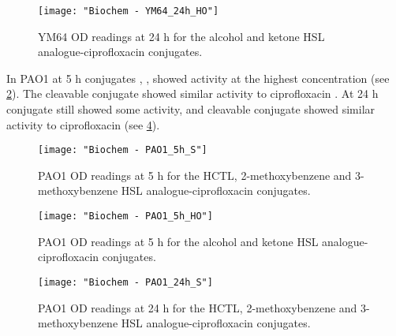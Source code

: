 \begin{figure}[H]
	\begin{center}
		\texttt{[image: "Biochem - YM64\_24h\_HO"]}
		\caption{YM64 OD readings at 24 h for the alcohol and ketone HSL analogue-ciprofloxacin conjugates.\label{fgr:YM64_24h_HO}}
	\end{center}
\end{figure}



In PAO1 at 5 h conjugates , ,  showed activity at the highest concentration (see \ref{fgr:PAO1_5h_S}). 
The cleavable conjugate  showed similar activity to ciprofloxacin .
At 24 h conjugate  still showed some activity, and
cleavable conjugate  showed similar activity to ciprofloxacin  (see \ref{fgr:PAO1_24h_S}).




\begin{figure}[H]
	\begin{center}
		\texttt{[image: "Biochem - PAO1\_5h\_S"]}
		\caption{PAO1 OD readings at 5 h for the HCTL, 2-methoxybenzene and 3-methoxybenzene HSL analogue-ciprofloxacin conjugates.\label{fgr:PAO1_5h_S}}
	\end{center}
\end{figure}

\begin{figure}[H]
	\begin{center}
		\texttt{[image: "Biochem - PAO1\_5h\_HO"]}
		\caption{PAO1 OD readings at 5 h for the alcohol and ketone HSL analogue-ciprofloxacin conjugates.\label{fgr:PAO1_5h_HO}}
	\end{center}
\end{figure}


\begin{figure}[H]
	\begin{center}
		\texttt{[image: "Biochem - PAO1\_24h\_S"]}
		\caption{PAO1 OD readings at 24 h for the HCTL, 2-methoxybenzene and 3-methoxybenzene HSL analogue-ciprofloxacin conjugates.\label{fgr:PAO1_24h_S}}
	\end{center}
\end{figure}

